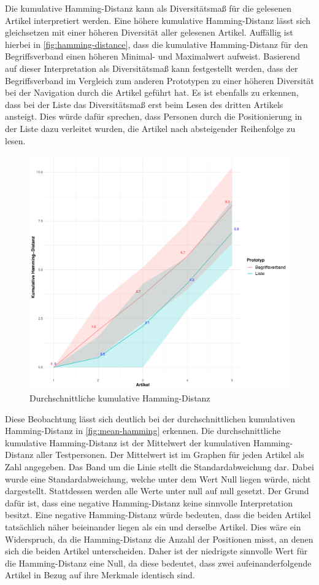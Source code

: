 Die kumulative Hamming-Distanz kann als Diversitätsmaß für die gelesenen Artikel interpretiert werden.
Eine höhere kumulative Hamming-Distanz lässt sich gleichsetzen mit einer höheren Diversität aller gelesenen Artikel.
Auffällig ist hierbei in \autoref{fig:hamming-distance}, dass die kumulative Hamming-Distanz für den Begriffsverband einen höheren Minimal- und Maximalwert aufweist.
Basierend auf dieser Interpretation als Diversitätsmaß kann festgestellt werden, dass der Begriffsverband im Vergleich zum anderen Prototypen zu einer höheren Diversität bei der Navigation durch die Artikel geführt hat.
Es ist ebenfalls zu erkennen, dass bei der Liste das Diversitätsmaß erst beim Lesen des dritten Artikels ansteigt.
Dies würde dafür sprechen, dass Personen durch die Positionierung in der Liste dazu verleitet wurden, die Artikel nach absteigender Reihenfolge zu lesen. \\

\begin{figure}[!ht]
    \centering
    \includegraphics[width=0.8\columnwidth]{figures/comparison-line.pdf}
    \caption{\label{fig:mean-hamming}Durchschnittliche kumulative Hamming-Distanz}
\end{figure}

Diese Beobachtung lässt sich deutlich bei der durchschnittlichen kumulativen Hamming-Distanz in \autoref{fig:mean-hamming} erkennen.
Die durchschnittliche kumulative Hamming-Distanz ist der Mittelwert der kumulativen Hamming-Distanz aller Testpersonen.
Der Mittelwert ist im Graphen für jeden Artikel als Zahl angegeben.
Das Band um die Linie stellt die Standardabweichung dar.
Dabei wurde eine Standardabweichung, welche unter dem Wert Null liegen würde, nicht dargestellt.
Stattdessen werden alle Werte unter null auf null gesetzt.
Der Grund dafür ist, dass eine negative Hamming-Distanz keine sinnvolle Interpretation besitzt.
Eine negative Hamming-Distanz würde bedeuten, dass die beiden Artikel tatsächlich näher beieinander liegen als ein und derselbe Artikel.
Dies wäre ein Widerspruch, da die Hamming-Distanz die Anzahl der Positionen misst, an denen sich die beiden Artikel unterscheiden.
Daher ist der niedrigste sinnvolle Wert für die Hamming-Distanz eine Null, da diese bedeutet, dass zwei aufeinanderfolgende Artikel in Bezug auf ihre Merkmale identisch sind.\\

